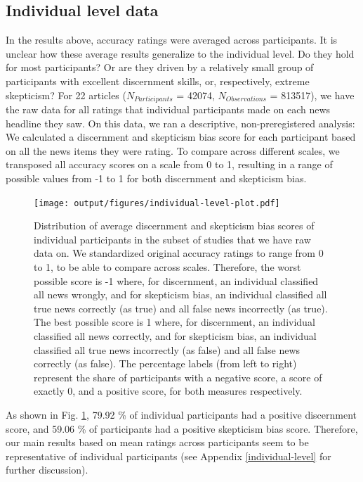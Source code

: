 \documentclass[
  doc,floatsintext]{apa6}
\begin{document}
\subsection{Individual level data}\label{individual-level-data}

In the results above, accuracy ratings were averaged across participants. It is unclear how these average results generalize to the individual level. Do they hold for most participants? Or are they driven by a relatively small group of participants with excellent discernment skills, or, respectively, extreme skepticism? For 22 articles (\(N_{Participants}\) = 42074, \(N_{Observations}\) = 813517), we have the raw data for all ratings that individual participants made on each news headline they saw. On this data, we ran a descriptive, non-preregistered analysis: We calculated a discernment and skepticism bias score for each participant based on all the news items they were rating. To compare across different scales, we transposed all accuracy scores on a scale from 0 to 1, resulting in a range of possible values from -1 to 1 for both discernment and skepticism bias.



\begin{figure}
\centering
\texttt{[image: output/figures/individual-level-plot.pdf]}
\caption{\label{fig:individual-level-plot}Distribution of average discernment and skepticism bias scores of individual participants in the subset of studies that we have raw data on. We standardized original accuracy ratings to range from 0 to 1, to be able to compare across scales. Therefore, the worst possible score is -1 where, for discernment, an individual classified all news wrongly, and for skepticism bias, an individual classified all true news correctly (as true) and all false news incorrectly (as true). The best possible score is 1 where, for discernment, an individual classified all news correctly, and for skepticism bias, an individual classified all true news incorrectly (as false) and all false news correctly (as false). The percentage labels (from left to right) represent the share of participants with a negative score, a score of exactly 0, and a positive score, for both measures respectively.}
\end{figure}

As shown in Fig. \ref{fig:individual-level-plot}, 79.92 \% of individual participants had a positive discernment score, and 59.06 \% of participants had a positive skepticism bias score. Therefore, our main results based on mean ratings across participants seem to be representative of individual participants (see Appendix \ref{individual-level} for further discussion).
\end{document}
